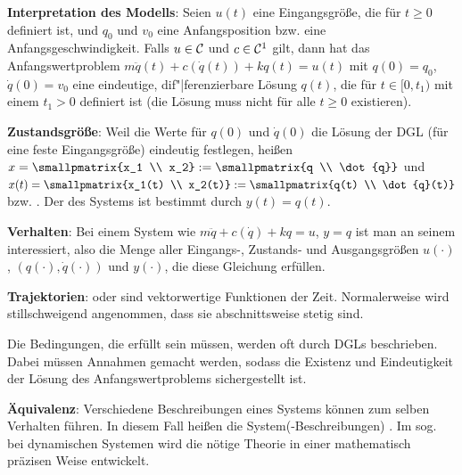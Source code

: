 \linie
\pagebreak

\textbf{Interpretation des Modells}:
Seien $u(t)$ eine Eingangsgröße, die für $t \ge 0$ definiert ist, und
$q_0$ und $v_0$ eine Anfangsposition bzw. eine Anfangsgeschwindigkeit.
Falls $u \in \mathcal{C}$ und $c \in \mathcal{C}^1$ gilt,
dann hat das Anfangswertproblem $m \ddot{q}(t) + c(\dot{q}(t)) + k q(t) = u(t)$ mit $q(0) = q_0$,
$\dot{q}(0) = v_0$ eine eindeutige, dif"|ferenzierbare Lösung $q(t)$, die für $t \in [0, t_1)$
mit einem $t_1 > 0$ definiert ist
(die Lösung muss nicht für alle $t \ge 0$ existieren).

\textbf{Zustandsgröße}:
Weil die Werte für $q(0)$ und $\dot{q}(0)$ die Lösung der DGL (für eine feste Eingangsgröße)
eindeutig festlegen,
heißen $x = \smallpmatrix{x_1 \\ x_2} := \smallpmatrix{q \\ \dot{q}}$ und
$x(t) = \smallpmatrix{x_1(t) \\ x_2(t)} := \smallpmatrix{q(t) \\ \dot{q}(t)}$
 bzw. .
Der  des Systems ist bestimmt durch $y(t) = q(t)$.

\textbf{Verhalten}:
Bei einem System wie $m \ddot{q} + c(\dot{q}) + kq = u$, $y = q$
ist man an seinem  interessiert,
also die Menge aller Eingangs-, Zustands- und Ausgangsgrößen $u(\cdot)$,
$(q(\cdot), \dot{q}(\cdot))$ und $y(\cdot)$, die diese Gleichung erfüllen.

\textbf{Trajektorien}:
 oder 
sind vektorwertige Funktionen der Zeit. 
Normalerweise wird stillschweigend angenommen, dass sie abschnittsweise stetig sind.

Die Bedingungen, die erfüllt sein müssen, werden oft durch DGLs beschrieben.
Dabei müssen Annahmen gemacht werden, sodass die Existenz und Eindeutigkeit der Lösung des
Anfangswertproblems sichergestellt ist.

\textbf{Äquivalenz}:
Verschiedene Beschreibungen eines Systems können zum selben Verhalten führen.
In diesem Fall heißen die System(-Beschreibungen) .
Im sog.  bei dynamischen Systemen wird die nötige Theorie in
einer mathematisch präzisen Weise entwickelt.

\linie

